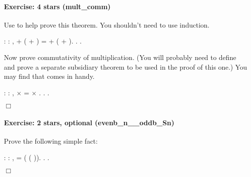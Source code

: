\documentclass[12pt]{report}
\begin{document}
\paragraph{Exercise: 4 stars (mult\_comm)}

 Use  to help prove this theorem.  You shouldn't need to
    use induction. \begin{coqdoccode}
\coqdocemptyline
\coqdocnoindent
{}  : \coqdockw{\ensuremath{\forall}}    : , \coqdoceol
\coqdocindent{1.00em}
 + ( + ) =  + ( + ).\coqdoceol
\coqdocnoindent
{}.\coqdoceol
 .\coqdoceol
\coqdocemptyline
\end{coqdoccode}
Now prove commutativity of multiplication.  (You will probably
    need to define and prove a separate subsidiary theorem to be used
    in the proof of this one.)  You may find that  comes in
    handy. \begin{coqdoccode}
\coqdocemptyline
\coqdocnoindent
{}  : \coqdockw{\ensuremath{\forall}}   : ,\coqdoceol
\coqdocindent{0.50em}
 \ensuremath{\times}  =  \ensuremath{\times} .\coqdoceol
\coqdocnoindent
{}.\coqdoceol
 .\coqdoceol
\end{coqdoccode}
\ensuremath{\Box} 

\paragraph{Exercise: 2 stars, optional (evenb\_n\_\_oddb\_Sn)}



 Prove the following simple fact: \begin{coqdoccode}
\coqdocemptyline
\coqdocnoindent
{}  : \coqdockw{\ensuremath{\forall}}  : ,\coqdoceol
\coqdocindent{1.00em}
  =  ( ( )).\coqdoceol
\coqdocnoindent
{}.\coqdoceol
 .\coqdoceol
\end{coqdoccode}
\ensuremath{\Box} \begin{coqdoccode}
\coqdocemptyline
\end{coqdoccode}
\end{document}
